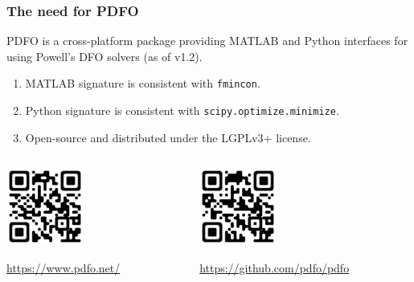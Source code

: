 \documentclass{polyu-presentation}
\begin{document}
\begin{frame}
    \frametitle{The need for PDFO}

    \begin{block}{}
        \alert{PDFO} is a \alert{cross-platform} package providing \alert{MATLAB and Python} interfaces for using Powell's DFO solvers (as of v1.2).
    \end{block}

    \medskip

    \begin{enumerate}
        \item \alert{MATLAB} signature is consistent with \texttt{fmincon}.
        \item \alert{Python} signature is consistent with \texttt{scipy.optimize.minimize}.
        \item \alert{Open-source} and distributed under the LGPLv3+ license.
    \end{enumerate}

    \medskip
    
    \begin{columns}
        \begin{column}{0.5\textwidth}
            \begin{center}
                \includegraphics[width=1in]{images/qr-codes/pdfo.png}

                \footnotesize\url{https://www.pdfo.net/}
            \end{center}
        \end{column}
        \begin{column}{0.5\textwidth}
            \begin{center}
                \includegraphics[width=1in]{images/qr-codes/pdfo-github.png}

                \footnotesize\url{https://github.com/pdfo/pdfo}
            \end{center}
        \end{column}
    \end{columns}
\end{frame}
\end{document}
